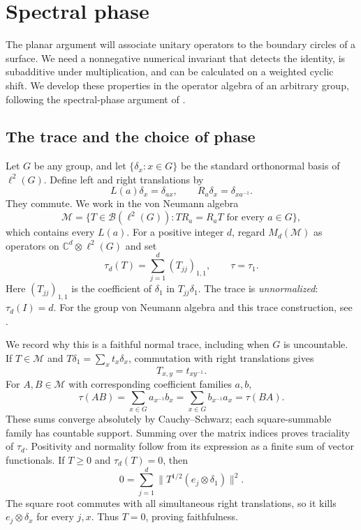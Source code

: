 \section{Spectral phase}\label{sec:phase}

The planar argument will associate unitary operators to the boundary circles
of a surface.  We need a nonnegative numerical invariant that detects the
identity, is subadditive under multiplication, and can be calculated on a
weighted cyclic shift.  We develop these properties in the operator algebra
of an arbitrary group, following the spectral-phase argument of
\cite[Lemma~2.1 and Section~4.3]{OpenAIKervaire2026}.

\subsection{The trace and the choice of phase}

Let $G$ be any group, and let $\{\delta_x:x\in G\}$ be the standard
orthonormal basis of $\ell^2(G)$.  Define left and right translations by
\[
 L(a)\delta_x=\delta_{ax},\qquad
 R_a\delta_x=\delta_{xa^{-1}}.
\]
They commute.  We work in the von Neumann algebra
\[
 \mathcal M=\{T\in\mathcal B(\ell^2(G)):TR_a=R_aT
             \text{ for every }a\in G\},
\]
which contains every $L(a)$.  For a positive integer $d$, regard
$M_d(\mathcal M)$ as operators on $\mathbb C^d\otimes\ell^2(G)$ and set
\begin{equation}\label{eq:group-trace}
 \tau_d(T)=\sum_{j=1}^d(T_{jj})_{1,1},\qquad \tau=\tau_1.
\end{equation}
Here $(T_{jj})_{1,1}$ is the coefficient of $\delta_1$ in
$T_{jj}\delta_1$.  The trace is \emph{unnormalized}: $\tau_d(I)=d$.
For the group von Neumann algebra and this trace construction, see
\cite[Section~3.3]{Jones2009}.

We record why this is a faithful normal trace, including when $G$ is
uncountable.  If $T\in\mathcal M$ and $T\delta_1=\sum_x t_x\delta_x$,
commutation with right translations gives
\[
 T_{x,y}=t_{xy^{-1}}.
\]
For $A,B\in\mathcal M$ with corresponding coefficient families $a,b$,
\[
 \tau(AB)=\sum_{x\in G}a_{x^{-1}}b_x
         =\sum_{x\in G}b_{x^{-1}}a_x=\tau(BA).
\]
These sums converge absolutely by Cauchy--Schwarz; each square-summable
family has countable support.  Summing over the matrix indices proves
traciality of $\tau_d$.  Positivity and normality follow from its expression
as a finite sum of vector functionals.  If $T\geq0$ and $\tau_d(T)=0$, then
\[
 0=\sum_{j=1}^d
   \bigl\|T^{1/2}(e_j\otimes\delta_1)\bigr\|^2.
\]
The square root commutes with all simultaneous right translations, so it
kills $e_j\otimes\delta_x$ for every $j,x$.  Thus $T=0$, proving
faithfulness.

